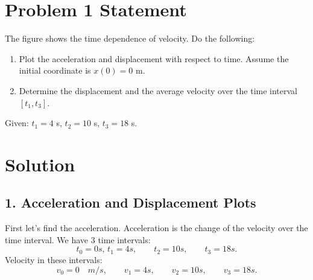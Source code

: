 \documentclass{article}
\begin{document}


\section*{Problem 1 Statement}
The figure shows the time dependence of velocity. Do the following:

\begin{enumerate}
    \item Plot the acceleration and displacement with respect to time. Assume the initial coordinate is $x(0) = 0$ m.
    \item Determine the displacement and the average velocity over the time interval $[t_1, t_3]$.
\end{enumerate}

Given: $t_1 = 4$ s, $t_2 = 10$ s, $t_3 = 18$ s.

\section*{Solution}

\subsection*{1. Acceleration and Displacement Plots}
First let's find the acceleration. Acceleration is the change of the velocity over the time interval.
We have 3 time intervals: 
\[
t_0 = 0s, \, t_1 = 4s, \qquad t_2 = 10s, \qquad t_3 = 18s.
\]
Velocity in these intervals:
\[
v_0 = 0 \quad m/s, \qquad v_1 = 4s, \qquad v_2 = 10s, \qquad v_3 = 18s.
\]
\end{document}
